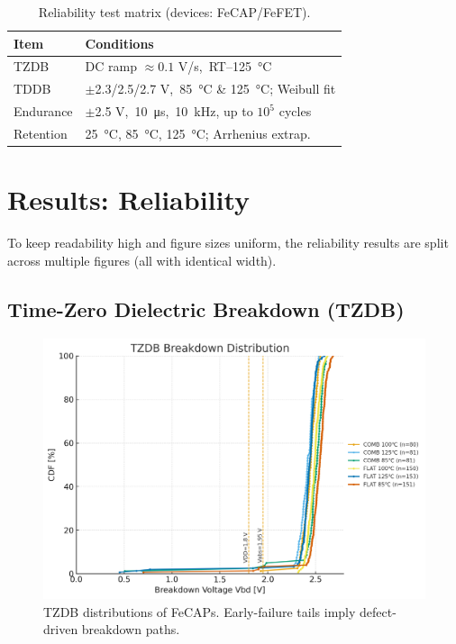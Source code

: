 \documentclass[conference]{IEEEtran}
\begin{document}
\begin{table}[!t]
  \centering
  \caption{Reliability test matrix (devices: FeCAP/FeFET).}
  \label{tab:test-matrix}
  \begin{tabular}{@{}ll@{}}
    \toprule
    \textbf{Item} & \textbf{Conditions} \\
    \midrule
    TZDB     & DC ramp $\approx 0.1$ V/s,\ RT--\SI{125}{\celsius} \\
    TDDB     & $\pm$2.3/2.5/2.7 V,\ \SI{85}{\celsius} \& \SI{125}{\celsius}; Weibull fit \\
    Endurance& $\pm$2.5 V,\ \SI{10}{\micro\second},\ \SI{10}{\kilo\hertz}, up to $10^5$ cycles \\
    Retention& \SI{25}{\celsius}, \SI{85}{\celsius}, \SI{125}{\celsius}; Arrhenius extrap. \\
    \bottomrule
  \end{tabular}
\end{table}

\section{Results: Reliability}
To keep readability high and figure sizes uniform, the reliability results are split across multiple figures (all with identical width).

\subsection{Time-Zero Dielectric Breakdown (TZDB)}
\begin{figure}[!t]
  \centering
  \includegraphics[width=0.95\linewidth]{figures/fig3_tzdb.png}
  \caption{TZDB distributions of FeCAPs. Early-failure tails imply defect-driven breakdown paths.}
  \label{fig:tzdb}
\end{figure}
\end{document}
